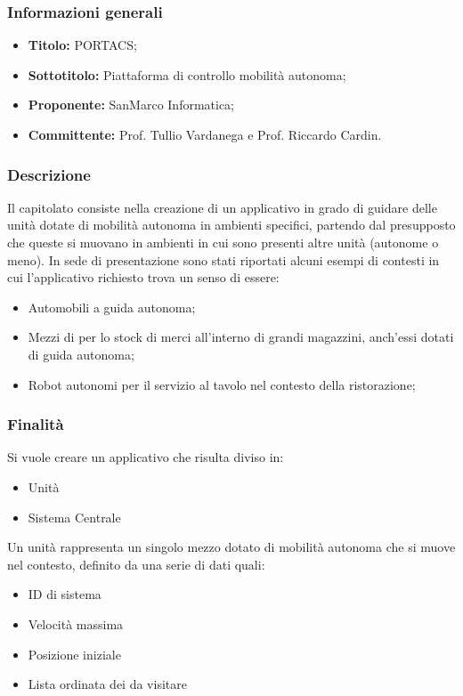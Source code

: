 \documentclass[]{article}
\begin{document}
			\subsubsection{Informazioni generali}
				\begin{itemize}
					\item \textbf{Titolo:} PORTACS;
					\item \textbf{Sottotitolo:} Piattaforma di controllo mobilità autonoma;
					\item \textbf{Proponente:} SanMarco Informatica;
					\item \textbf{Committente:} Prof. Tullio Vardanega e Prof. Riccardo Cardin.
				\end{itemize}

			\subsubsection{Descrizione}
			Il capitolato consiste nella creazione di un applicativo  in grado di guidare delle unità dotate di mobilità autonoma in ambienti specifici, partendo dal presupposto che queste si muovano in ambienti in cui sono presenti altre unità (autonome o meno). In sede di presentazione sono stati riportati alcuni esempi di contesti in cui l'applicativo richiesto trova un senso di essere:
			\begin{itemize}
				\item Automobili a guida autonoma;
				\item Mezzi di per lo stock di merci all'interno di grandi magazzini, anch'essi dotati di guida autonoma;
				\item Robot autonomi per il servizio al tavolo nel contesto della ristorazione;
			\end{itemize}

			\subsubsection{Finalità}
			Si vuole creare un applicativo che risulta diviso in:
			\begin{itemize}
				\item Unità
				\item Sistema Centrale
			\end{itemize}
			Un unità rappresenta un singolo mezzo dotato di mobilità autonoma che si muove nel contesto, definito da una serie di dati quali:
			 \begin{itemize}
			 	\item ID di sistema
			 	\item Velocità massima
			 	\item Posizione iniziale
			 	\item Lista ordinata dei  da visitare
			 \end{itemize}
\end{document}
